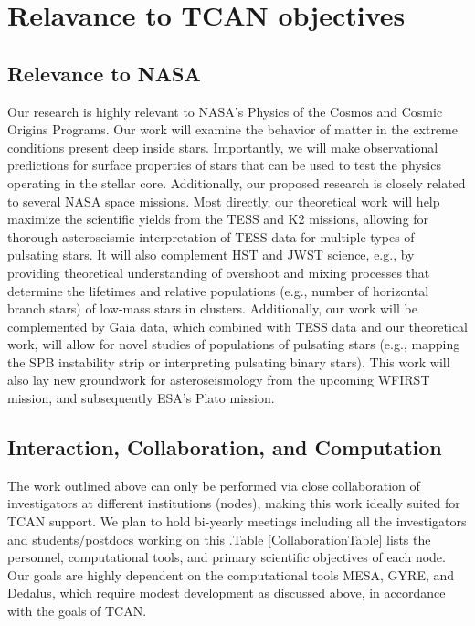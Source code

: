 {\color{orange}
\section{Relavance to TCAN objectives}
}

{\color{orange}
\subsection{Relevance to NASA}
}

Our research is highly relevant to NASA's Physics of the Cosmos and Cosmic Origins Programs. Our work will examine the behavior of matter in the extreme conditions present deep inside stars. Importantly, we will make observational predictions for surface properties of stars that can be used to test the physics operating in the stellar core. Additionally, our proposed research is closely related to several NASA space missions. Most directly, our theoretical work will help maximize the scientific yields from the TESS and K2 missions, allowing for thorough asteroseismic interpretation of TESS data for multiple types of pulsating stars. It will also complement HST and JWST science, e.g., by providing theoretical understanding of overshoot and mixing processes that determine the lifetimes and relative populations (e.g., number of horizontal branch stars) of low-mass stars in clusters. Additionally, our work will be complemented by Gaia data, which combined with TESS data and our theoretical work, will allow for novel studies of populations of pulsating stars (e.g., mapping the SPB instability strip or interpreting pulsating binary stars). This work will also lay new groundwork for asteroseismology from the upcoming WFIRST mission, and subsequently ESA's Plato mission. 


{\color{orange}
\subsection{Interaction, Collaboration, and Computation}
}

The work outlined above can only be performed via close collaboration of investigators at different institutions (nodes), making this work ideally suited for TCAN support. We plan to hold bi-yearly meetings including all the investigators and students/postdocs working on this .Table \ref{CollaborationTable} lists the personnel, computational tools, and primary scientific objectives of each node. Our goals are highly dependent on the computational tools MESA, GYRE, and Dedalus, which require modest development as discussed above, in accordance with the goals of TCAN.



